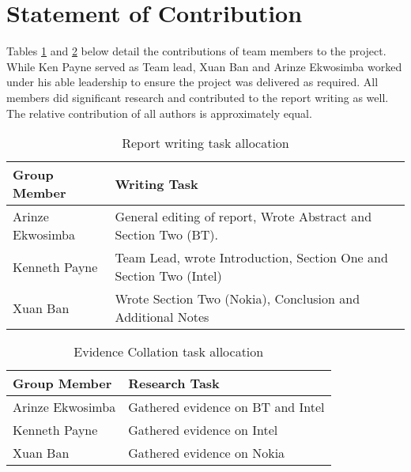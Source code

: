 

\section{Statement of Contribution} \label{Section:Contribution}

Tables \ref{tab:jobs} and \ref{tab:jobs2} below detail the contributions of team members to the project.  While Ken Payne served as Team lead, Xuan Ban and Arinze Ekwosimba worked under his able leadership to ensure the project was delivered as required.  All members did significant research and contributed to the report writing as well.  The relative contribution of all authors is approximately equal.

\begin{table}
\begin{center}
\renewcommand{\arraystretch}{1.3}
\setlength{\tabcolsep}{7pt}
\begin{tabular}{ll}
\hline
\textbf{Group Member} & \textbf{Writing Task}\\
\hline
Arinze Ekwosimba & General editing of report, Wrote Abstract and Section Two (BT). \\
Kenneth Payne & Team Lead, wrote Introduction, Section One and Section Two (Intel) \\
Xuan Ban & Wrote Section Two (Nokia), Conclusion and Additional Notes \\
\hline
\end{tabular}
\caption{Report writing task allocation}
\label{tab:jobs}%
\end{center}
\end{table}

\begin{table}
\begin{center}
\renewcommand{\arraystretch}{1.3}
\setlength{\tabcolsep}{7pt}
\begin{tabular}{ll}
\hline
\textbf{Group Member} & \textbf{Research Task}\\
\hline
Arinze Ekwosimba & Gathered evidence on BT and Intel \\
Kenneth Payne & Gathered evidence on Intel \\
Xuan Ban & Gathered evidence on Nokia \\
\hline
\end{tabular}
\caption{Evidence Collation task allocation}
\label{tab:jobs2}%
\end{center}
\end{table}